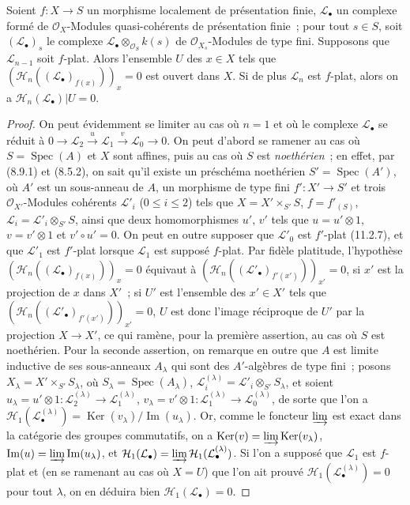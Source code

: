 \begin{proposition}[12.3.3]
\label{IV.12.3.3-fr}
Soient $f:X\to S$ un morphisme localement de présentation finie,
$\mathcal L_\bullet$ un complexe formé de $\mathcal O_X$-Modules
quasi-cohérents de présentation finie~; pour tout $s\in S$, soit
$(\mathcal L_\bullet)_s$ le complexe
$\mathcal L_\bullet\otimes_{\mathcal O_S}k(s)$ de $\mathcal O_{X_s}$-Modules de
type fini. Supposons que $\mathcal L_{n-1}$ soit $f$-plat. Alors l'ensemble $U$
des $x\in X$ tels que $(\mathcal H_n((\mathcal L_\bullet)_{f(x)}))_x=0$ est
ouvert dans $X$. Si de plus $\mathcal L_n$ est $f$-plat, alors on a
$\mathcal H_n(\mathcal L_\bullet)|U=0$.
\end{proposition}

\begin{proof}
On peut évidemment se limiter au cas où $n=1$ et où le complexe
$\mathcal L_\bullet$ se réduit à
$0\to\mathcal L_2\xrightarrow{u}\mathcal L_1\xrightarrow{v}\mathcal L_0\to0$.
On peut d'abord se ramener au cas où $S=\operatorname{Spec}(A)$ et $X$
sont affines, puis au cas où $S$ est \emph{noethérien}~; en effet, par (8.9.1)
et (8.5.2), on sait qu'il existe un préschéma noethérien
$S'=\operatorname{Spec}(A')$, où $A'$ est un sous-anneau de $A$, un morphisme
de type fini $f':X'\to S'$ et trois $\mathcal O_{X'}$-Modules cohérents
$\mathcal L'_i$ ($0\leq i\leq2$) tels que $X=X'\times_{S'}S$,
$f=f'_{(S)}$, $\mathcal L_i=\mathcal L'_i\otimes_{S'}S$, ainsi que deux
homomorphismes $u'$, $v'$ tels que $u=u'\otimes1$, $v=v'\otimes1$ et
$v'\circ u'=0$. On peut en outre supposer que $\mathcal L'_0$ est $f'$-plat
(11.2.7), et que $\mathcal L'_1$ est $f'$-plat lorsque $\mathcal L_1$ est
supposé $f$-plat. Par fidèle platitude, l'hypothèse
$(\mathcal H_n((\mathcal L_\bullet)_{f(x)}))_x=0$ équivaut à
$(\mathcal H_n((\mathcal L'_\bullet)_{f'(x')}))_{x'}=0$, si $x'$ est la
projection de $x$ dans $X'$~; si $U'$ est l'ensemble des $x'\in X'$ tels que
$(\mathcal H_n((\mathcal L'_\bullet)_{f'(x')}))_{x'}=0$, $U$ est donc l'image
réciproque de $U'$ par la projection $X\to X'$, ce qui ramène, pour la première
assertion, au cas où $S$ est noethérien. Pour la seconde assertion, on remarque
en outre que $A$ est limite inductive de ses sous-anneaux $A_\lambda$ qui sont
des $A'$-algèbres de type fini~; posons
$X_\lambda=X'\times_{S'}S_\lambda$, où
$S_\lambda=\operatorname{Spec}(A_\lambda)$,
$\mathcal L_i^{(\lambda)}=\mathcal L'_i\otimes_{S'}S_\lambda$, et soient
$u_\lambda=u'\otimes1:\mathcal L_2^{(\lambda)}\to\mathcal L_1^{(\lambda)}$,
$v_\lambda=v'\otimes1:\mathcal L_1^{(\lambda)}\to\mathcal L_0^{(\lambda)}$,
de sorte que l'on a
$\mathcal H_1(\mathcal L_\bullet^{(\lambda)})
=\operatorname{Ker}(v_\lambda)/\operatorname{Im}(u_\lambda)$. Or, comme le
foncteur $\varinjlim$ est exact dans la catégorie des groupes commutatifs, on a
$\operatorname{Ker}(v)=\varinjlim\operatorname{Ker}(v_\lambda)$,
$\operatorname{Im}(u)=\varinjlim\operatorname{Im}(u_\lambda)$, et
$\mathcal H_1(\mathcal L_\bullet)
=\varinjlim\mathcal H_1(\mathcal L_\bullet^{(\lambda)})$. Si l'on a supposé
que $\mathcal L_1$ est $f$-plat et (en se ramenant au cas où $X=U$) que l'on
ait prouvé $\mathcal H_1(\mathcal L_\bullet^{(\lambda)})=0$ pour tout
$\lambda$, on en déduira bien $\mathcal H_1(\mathcal L_\bullet)=0$.


\end{proof}
